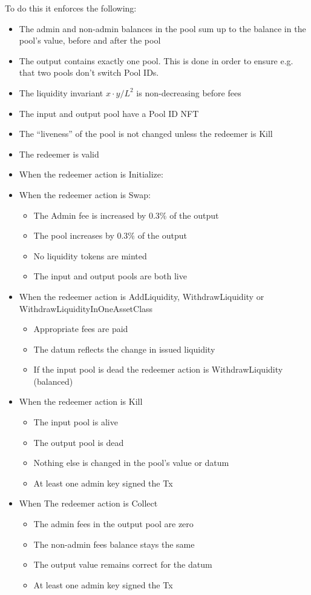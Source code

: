 \documentclass{article}
\begin{document}
To do this it enforces the following:
\begin{itemize}
  \item The admin and non-admin balances in the pool sum up to the balance in
    the pool's value, before and after the pool
  \item The output contains exactly one pool. This is done in order to ensure
    e.g. that two pools don't switch Pool IDs.
  \item The liquidity invariant $x \cdot y / L^2$ is non-decreasing before fees
  \item The input and output pool have a Pool ID NFT
  \item The ``liveness'' of the pool is not changed unless the redeemer is Kill
  \item The redeemer is valid 
  \item When the redeemer action is Initialize: 
  \item When the redeemer action is Swap:
    \begin{itemize}
      \item The Admin fee is increased by $0.3\%$ of the output
      \item The pool increases by $0.3\%$ of the output
      \item No liquidity tokens are minted
      \item The input and output pools are both live
    \end{itemize}
  \item When the redeemer action is AddLiquidity, WithdrawLiquidity or
    WithdrawLiquidityInOneAssetClass
    \begin{itemize}
      \item Appropriate fees are paid
      \item The datum reflects the change in issued liquidity
      \item If the input pool is dead the redeemer action is WithdrawLiquidity
        (balanced)
    \end{itemize}
  \item When the redeemer action is Kill
  	\begin{itemize}
      \item The input pool is alive
  		\item The output pool is dead
  		\item Nothing else is changed in the pool's value or datum
  		\item At least one admin key signed the Tx
  	\end{itemize}
  \item When The redeemer action is Collect
  	\begin{itemize}
  		\item The admin fees in the output pool are zero
  		\item The non-admin fees balance stays the same
  		\item The output value remains correct for the datum
  		\item At least one admin key signed the Tx
  	\end{itemize}
\end{itemize}
\end{document}
